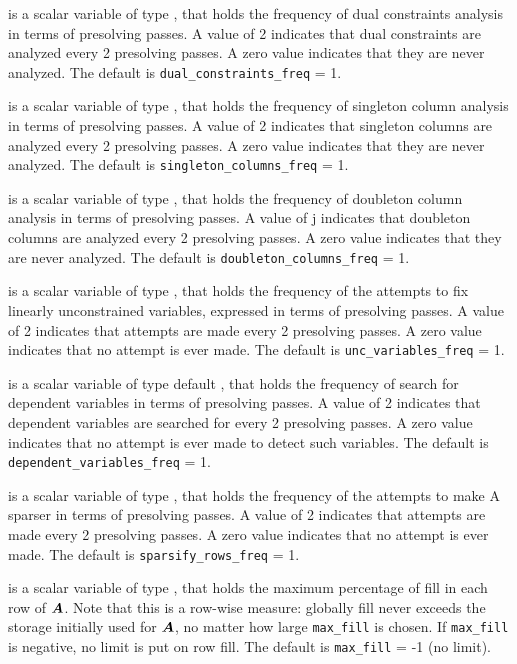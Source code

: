 \documentclass{galahad}
\begin{document}
\begin{description}
 is a scalar variable of type \integer,
that holds the frequency of dual constraints analysis in terms of
presolving passes.  A value of 2 indicates that dual
constraints are analyzed every 2 presolving passes.  A zero
value indicates that they are never analyzed.
The default is {\tt dual\_constraints\_freq} = 1.

 is a scalar variable of type \integer,
that holds the frequency of singleton column analysis in terms of
presolving passes.  A value of 2 indicates that
singleton columns are analyzed every 2 presolving passes.
A zero value indicates that they are never analyzed.
The default is {\tt singleton\_columns\_freq} = 1.

 is a scalar variable of type \integer,
that holds the frequency of doubleton column analysis in terms of
presolving passes.  A value of j indicates that doubleton
columns are analyzed every 2 presolving passes.  A zero
value indicates that they are never analyzed.
The default is {\tt doubleton\_columns\_freq} = 1.

 is a scalar variable of type \integer,
that holds the frequency of the attempts to fix linearly unconstrained
variables, expressed in terms of presolving passes.  A
value of 2 indicates that attempts are made every 2
presolving passes.  A zero value indicates that no attempt is ever made.
The default is {\tt unc\_variables\_freq} = 1.

 is a scalar variable of type default
\integer, that holds the frequency of search for dependent variables in terms
of  presolving passes.  A value of 2 indicates that
dependent variables are searched for every 2 presolving
passes.  A zero value indicates that no attempt is ever made to detect such
variables. The default is {\tt dependent\_variables\_freq} = 1.

 is a scalar variable of type \integer,
that holds the frequency of the attempts to make A sparser in terms of
presolving passes.  A value of 2 indicates that attempts
are made every 2 presolving passes.  A zero value indicates
that no attempt is ever made.
The default is {\tt sparsify\_rows\_freq} = 1.

 is a scalar variable of type \integer, that holds
the maximum percentage of fill in each row of ${\bm{A}}$. Note that
this is a row-wise measure: globally fill never exceeds
the storage initially used for ${\bm{A}}$, no matter how large
{\tt max\_fill} is chosen. If {\tt max\_fill} is negative,
no limit is put on row fill.
The default is {\tt max\_fill} = -1 (no limit).


\end{description}
\end{document}
